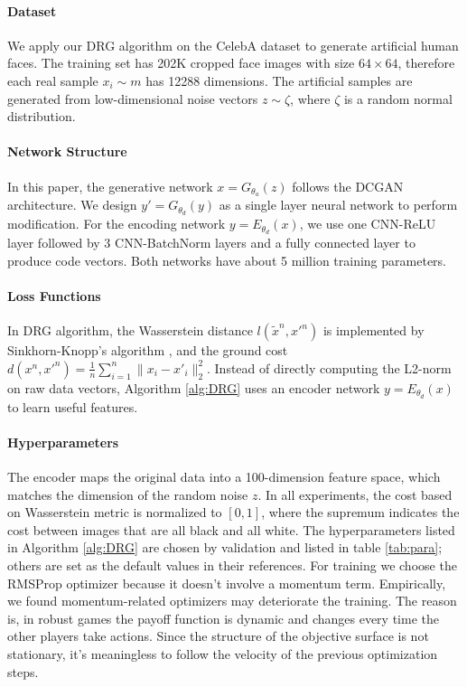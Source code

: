 \documentclass{article}
\begin{document}
\paragraph{Dataset}
We apply our DRG algorithm on the CelebA \cite{liu2015faceattributes} dataset to generate artificial human faces. The training set has 202K cropped face images with size $64\times64$, therefore each real sample $x_i \sim m$ has 12288 dimensions. The artificial samples are generated from low-dimensional noise vectors $z \sim \zeta$, where $\zeta$ is a random normal distribution.

\paragraph{Network Structure}
In this paper, the generative network $x = G_{\theta_a}(z)$ follows the DCGAN \cite{DBLP:journals/corr/RadfordMC15} architecture. We design $y' = G_{\theta_d}(y)$ as a single layer neural network to perform modification. For the encoding network $y = E_{\theta_d}(x)$, we use one CNN-ReLU layer followed by 3 CNN-BatchNorm layers and a fully connected layer to produce code vectors. Both networks have about 5 million training parameters.

\paragraph{Loss Functions}
In DRG algorithm, the Wasserstein distance $l(\tilde{x}^n, {x'}^n)$ is implemented by Sinkhorn-Knopp's algorithm \cite{sinkhorn1967}, and the ground cost $d(x^n,{x'}^n) = \frac{1}{n} \sum_{i=1}^{n}\|x_i - x'_i\|_2^2$. Instead of directly computing the L2-norm on raw data vectors, Algorithm \ref{alg:DRG} uses an encoder network $y = E_{\theta_d}(x)$ to learn useful features.

\paragraph{Hyperparameters}
The encoder maps the original data into a 100-dimension feature space, which matches the dimension of the random noise $z$. In all experiments, the cost based on Wasserstein metric is normalized to $[0,1]$, where the supremum indicates the cost between images that are all black and all white. The hyperparameters listed in Algorithm \ref{alg:DRG} are chosen by validation and listed in table \ref{tab:para}; others are set as the default values in their references. For training we choose the RMSProp optimizer \cite{DBLP:journals/corr/Ruder16} because it doesn't involve a momentum term. Empirically, we found momentum-related optimizers may deteriorate the training. The reason is, in robust games the payoff function is dynamic and changes every time the other players take actions. Since the structure of the objective surface is not stationary, it's meaningless to follow the velocity of the previous optimization steps.
\end{document}
